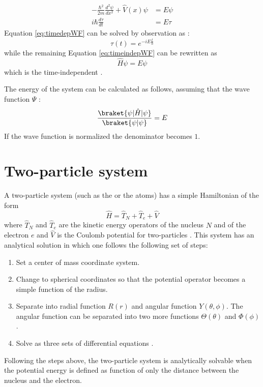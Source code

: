 \documentclass[../master_thesis.tex]{subfiles}
\begin{document}
\begin{subequations}
  \label{eq:sysSE}
  \begin{align}
    -\frac{\hbar^2}{2m}\frac{d^2\psi}{d x^2} + \hat{V}(x)\psi &= E\psi  \label{eq:timeindepWF}\\
    i\hbar\frac{d\tau}{d t} &= E\tau  \label{eq:timedepWF}
  \end{align}
\end{subequations}
Equation \ref{eq:timedepWF} can be solved by observation as \cite{Atkins:2011, Cohen:1973} :
\begin{equation}
  \tau(t) = e^{-iE\frac{t}{\hbar}}
\end{equation}
while the remaining Equation \ref{eq:timeindepWF} can be rewritten as
\begin{equation}
  \hat{H}\psi = E\psi\label{eq:timeindepSE}
\end{equation}
which is the time-independent \SE.

The energy of the system can be calculated as follows, assuming that the wave
function $\Psi$ \cite{Cramer:2004}:
\begin{equation}\label{eq:endevaleq}
  \frac{\braket{\psi|\hat{H}|\psi}}{\braket{\psi|\psi}} = E
\end{equation}
If the wave function is normalized the denominator becomes $1$.

\section{Two-particle system}
A two-particle system (such as the  or the  atoms) has a simple
Hamiltonian of the form
\begin{equation}
  \hat{H}=\hat{T}_{N}+\hat{T}_{e}+\hat{V}
\end{equation}
where $\hat{T}_N$ and $\hat{T}_e$ are the kinetic energy operators of the nucleus $N$ and
of the electron $e$ and $\hat{V}$ is the Coulomb potential for two-particles
\cite{Atkins:2014, Jensen:2017}.
This system has an analytical solution in which one follows the following set
of steps:
\begin{enumerate}
  \item Set a center of mass coordinate system.
  \item Change to spherical coordinates so that the potential operator becomes a
  simple function of the radius.
  \item Separate into radial function $R(r)$ and angular function
  $Y(\theta, \phi)$. The angular function can be separated into two more
  functions $\Theta(\theta)$ and $\Phi(\phi)$.
  \item Solve as three sets of differential equations \cite{Simons:2016}.
\end{enumerate}
Following the steps above, the two-particle system is analytically solvable when
the potential energy is defined as function of only the distance between the
nucleus and the electron.
\end{document}

